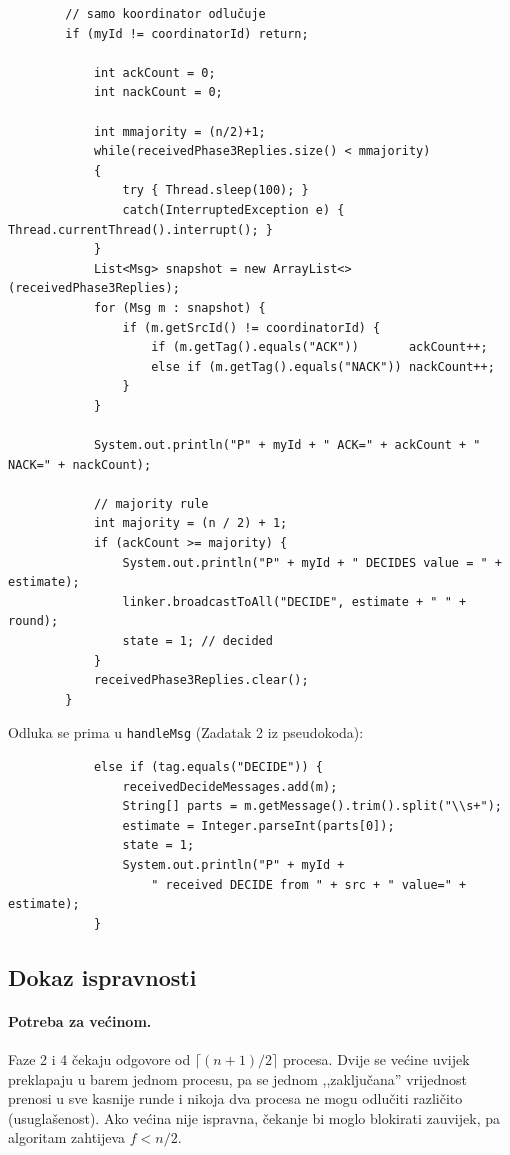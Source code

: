 \documentclass[11pt,a4paper]{article}
\begin{document}
\begin{lstlisting}
        // samo koordinator odlučuje
        if (myId != coordinatorId) return;

            int ackCount = 0;
            int nackCount = 0;

            int mmajority = (n/2)+1;
            while(receivedPhase3Replies.size() < mmajority)
            {
                try { Thread.sleep(100); }
                catch(InterruptedException e) { Thread.currentThread().interrupt(); }
            }
            List<Msg> snapshot = new ArrayList<>(receivedPhase3Replies);
            for (Msg m : snapshot) {
                if (m.getSrcId() != coordinatorId) {
                    if (m.getTag().equals("ACK"))       ackCount++;
                    else if (m.getTag().equals("NACK")) nackCount++;
                }
            }

            System.out.println("P" + myId + " ACK=" + ackCount + " NACK=" + nackCount);

            // majority rule
            int majority = (n / 2) + 1;
            if (ackCount >= majority) {
                System.out.println("P" + myId + " DECIDES value = " + estimate);
                linker.broadcastToAll("DECIDE", estimate + " " + round);
                state = 1; // decided
            }
            receivedPhase3Replies.clear();
        }
\end{lstlisting}

Odluka se prima u \texttt{handleMsg} (Zadatak 2 iz pseudokoda):

\begin{lstlisting}
            else if (tag.equals("DECIDE")) {
                receivedDecideMessages.add(m);
                String[] parts = m.getMessage().trim().split("\\s+");
                estimate = Integer.parseInt(parts[0]);
                state = 1;
                System.out.println("P" + myId +
                    " received DECIDE from " + src + " value=" + estimate);
            }
\end{lstlisting}

\subsection{Dokaz ispravnosti}

\paragraph{Potreba za većinom.} Faze 2 i 4 čekaju odgovore od $\lceil (n{+}1)/2
\rceil$ procesa. Dvije se većine uvijek preklapaju u barem jednom procesu, pa se
jednom ,,zaključana'' vrijednost prenosi u sve kasnije runde i nikoja dva procesa
ne mogu odlučiti različito (usuglašenost). Ako većina nije ispravna, čekanje bi
moglo blokirati zauvijek, pa algoritam zahtijeva $f < n/2$.
\end{document}
